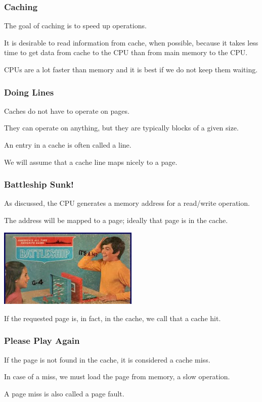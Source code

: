 \begin{frame}
\frametitle{Caching}

The goal of caching is to speed up operations. 

It is desirable to read information from cache, when possible, because it takes less time to get data from cache to the CPU than from main memory to the CPU. 

CPUs are a lot faster than memory and it is best if we do not keep them waiting.

\end{frame}

\begin{frame}
\frametitle{Doing Lines}

Caches do not have to operate on pages. 

They can operate on anything, but they are typically blocks of a given size. 

An entry in a cache is often called a \alert{line}. 

We will assume that a cache line maps nicely to a page.

\end{frame}

\begin{frame}
\frametitle{Battleship Sunk!}

As discussed, the CPU generates a memory address for a read/write operation. 

The address will be mapped to a page; ideally that page is in the cache.

\begin{center}
	\includegraphics[width=0.5\textwidth]{images/battleship.jpg}
\end{center}

If the requested page is, in fact,  in the cache, we call that a cache \alert{hit}.

\end{frame}

\begin{frame}
\frametitle{Please Play Again}

If the page is not found in the cache, it is considered a cache \alert{miss}. 

In case of a miss, we must load the page from memory, a slow operation. 

A page miss is also called a \alert{page fault}.

\end{frame}

